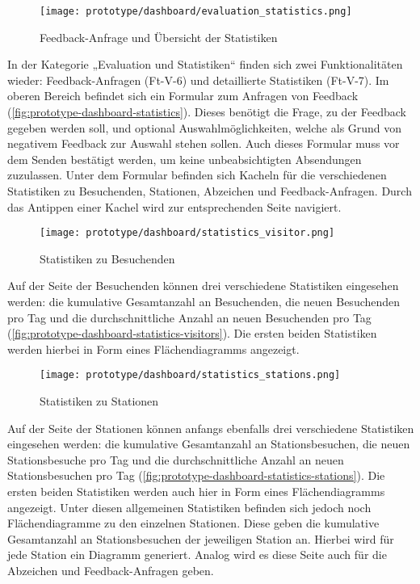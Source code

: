 \begin{figure}[htpb]
    \centering
    \texttt{[image: prototype/dashboard/evaluation\_statistics.png]}
    \caption{Feedback-Anfrage und Übersicht der Statistiken}
    \label{fig:prototype-dashboard-statistics}
\end{figure}

In der Kategorie „Evaluation und Statistiken“ finden sich zwei Funktionalitäten
wieder: Feedback-Anfragen (Ft-V-6) und detaillierte Statistiken (Ft-V-7). Im
oberen Bereich befindet sich ein Formular zum Anfragen von Feedback
(\autoref{fig:prototype-dashboard-statistics}). Dieses benötigt die Frage, zu
der Feedback gegeben werden soll, und optional Auswahlmöglichkeiten, welche als
Grund von negativem Feedback zur Auswahl stehen sollen. Auch dieses Formular
muss vor dem Senden bestätigt werden, um keine unbeabsichtigten Absendungen
zuzulassen. Unter dem Formular befinden sich Kacheln für die verschiedenen
Statistiken zu Besuchenden, Stationen, Abzeichen und Feedback-Anfragen. Durch
das Antippen einer Kachel wird zur entsprechenden Seite navigiert.

\begin{figure}[htpb]
    \centering
    \texttt{[image: prototype/dashboard/statistics\_visitor.png]}
    \caption{Statistiken zu Besuchenden}
    \label{fig:prototype-dashboard-statistics-visitors}
\end{figure}

Auf der Seite der Besuchenden können drei verschiedene Statistiken eingesehen
werden: die kumulative Gesamtanzahl an Besuchenden, die neuen Besuchenden pro
Tag und die durchschnittliche Anzahl an neuen Besuchenden pro Tag
(\autoref{fig:prototype-dashboard-statistics-visitors}). Die ersten beiden
Statistiken werden hierbei in Form eines Flächendiagramms angezeigt.

\begin{figure}[htpb]
    \centering
    \texttt{[image: prototype/dashboard/statistics\_stations.png]}
    \caption{Statistiken zu Stationen}
    \label{fig:prototype-dashboard-statistics-stations}
\end{figure}

Auf der Seite der Stationen können anfangs ebenfalls drei verschiedene
Statistiken eingesehen werden: die kumulative Gesamtanzahl an Stationsbesuchen,
die neuen Stationsbesuche pro Tag und die durchschnittliche Anzahl an neuen
Stationsbesuchen pro Tag (\autoref{fig:prototype-dashboard-statistics-stations}). Die ersten beiden Statistiken werden auch hier in Form
eines Flächendiagramms angezeigt. Unter diesen allgemeinen Statistiken befinden
sich jedoch noch Flächendiagramme zu den einzelnen Stationen. Diese geben die
kumulative Gesamtanzahl an Stationsbesuchen der jeweiligen Station an. Hierbei
wird für jede Station ein Diagramm generiert. Analog wird es diese Seite auch
für die Abzeichen und Feedback-Anfragen geben.

